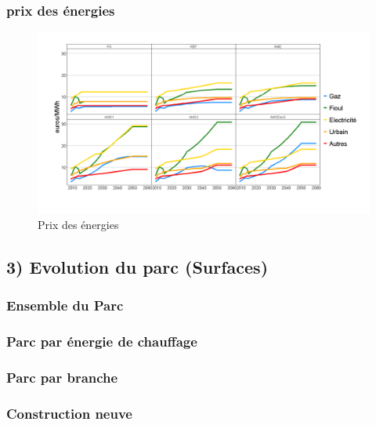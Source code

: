\documentclass[]{article}
\begin{document}
\subsubsection{prix des énergies}\label{prix-des-energies}

\begin{figure}
\centering
\includegraphics{Exemple_sortiestertiaire_files/figure-latex/Evol_prix_scen-1.png}
\caption{Prix des énergies}
\end{figure}

\subsection{3) Evolution du parc
(Surfaces)}\label{evolution-du-parc-surfaces}

\subsubsection{Ensemble du Parc}\label{ensemble-du-parc}

\subsubsection{Parc par énergie de
chauffage}\label{parc-par-energie-de-chauffage}

\subsubsection{Parc par branche}\label{parc-par-branche}

\pagebreak

\pagebreak

\subsubsection{Construction neuve}\label{construction-neuve}
\end{document}
